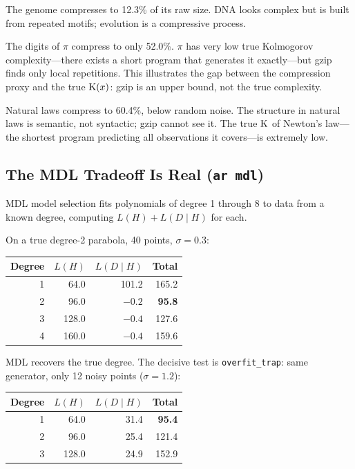 The genome compresses to 12.3\% of its raw size. DNA looks complex but
is built from repeated motifs; evolution is a compressive process.

The digits of $\pi$ compress to only 52.0\%. $\pi$ has very low true
Kolmogorov complexity---there exists a short program that generates it
exactly---but gzip finds only local repetitions. This illustrates the
gap between the compression proxy and the true $\mathrm{K}(x)$: gzip is an
upper bound, not the true complexity.

Natural laws compress to 60.4\%, below random noise. The structure
in natural laws is semantic, not syntactic; gzip cannot see it. The
true $\mathrm{K}$ of Newton's law---the shortest program predicting all
observations it covers---is extremely low.

\subsection{The MDL Tradeoff Is Real (\texttt{ar mdl})}

MDL model selection fits polynomials of degree 1 through 8 to data
from a known degree, computing $L(H) + L(D \mid H)$ for each.

On a true degree-2 parabola, 40 points, $\sigma = 0.3$:

\begin{center}
\begin{tabular}{rrrr}
\toprule
Degree & $L(H)$ & $L(D \mid H)$ & Total \\
\midrule
1 & 64.0 & 101.2 & 165.2 \\
2 & 96.0 & $-0.2$ & \textbf{95.8} \\
3 & 128.0 & $-0.4$ & 127.6 \\
4 & 160.0 & $-0.4$ & 159.6 \\
\bottomrule
\end{tabular}
\end{center}

MDL recovers the true degree. The decisive test is
\texttt{overfit\_trap}: same generator, only 12 noisy points
($\sigma = 1.2$):

\begin{center}
\begin{tabular}{rrrr}
\toprule
Degree & $L(H)$ & $L(D \mid H)$ & Total \\
\midrule
1 & 64.0 & 31.4 & \textbf{95.4} \\
2 & 96.0 & 25.4 & 121.4 \\
3 & 128.0 & 24.9 & 152.9 \\
\bottomrule
\end{tabular}
\end{center}

